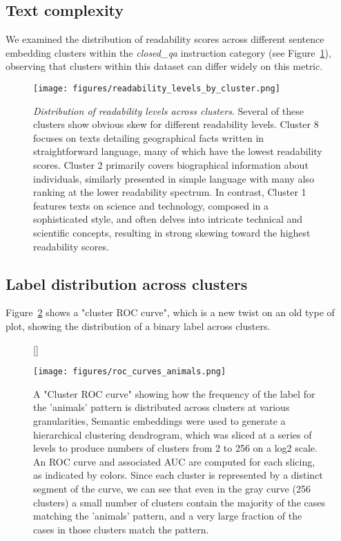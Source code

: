 \subsection{Text complexity}

We examined the distribution of readability scores across different sentence embedding clusters within the {\em closed\_qa} instruction category (see Figure~\ref{fig:readability_levels_by_cluster}), observing that clusters within this dataset can differ widely on this metric.

\begin{figure}
  \centering
  \texttt{[image: figures/readability\_levels\_by\_cluster.png]}
  \caption{
  \emph{Distribution of readability levels across clusters}. Several of these clusters show obvious skew for different readability levels. Cluster 8 focuses on texts detailing geographical facts written in straightforward language, many of which have the lowest readability scores. Cluster 2 primarily covers biographical information about individuals, similarly presented in simple language with many also ranking at the lower readability spectrum. In contrast, Cluster 1 features texts on science and technology, composed in a sophisticated style, and often delves into intricate technical and scientific concepts, resulting in strong skewing toward the highest readability scores.
  }
  \label{fig:readability_levels_by_cluster}
\end{figure}

\subsection{Label distribution across clusters}

Figure~\ref{fig:roc_curves_animals} shows a "cluster ROC curve", which is a new twist on an old type of plot, showing the distribution of a binary label across clusters.

\begin{figure}
  \centering
  [\FBwidth]
  {  
      \caption{  
      A "Cluster ROC curve" showing how the frequency of the label for the 'animals' pattern is distributed across clusters at various granularities, Semantic embeddings were used to generate a hierarchical clustering dendrogram, which was sliced at a series of levels to produce numbers of clusters from 2 to 256 on a log2 scale. An ROC curve and associated AUC are computed for each slicing, as indicated by colors. Since each cluster is represented by a distinct segment of the curve, we can see that even in the gray curve (256 clusters) a small number of clusters contain the majority of the cases matching the 'animals' pattern, and a very large fraction of the cases in those clusters match the pattern. 
      }
  }
  {
     \texttt{[image: figures/roc\_curves\_animals.png]}
    \label{fig:roc_curves_animals}
  }
\end{figure}
